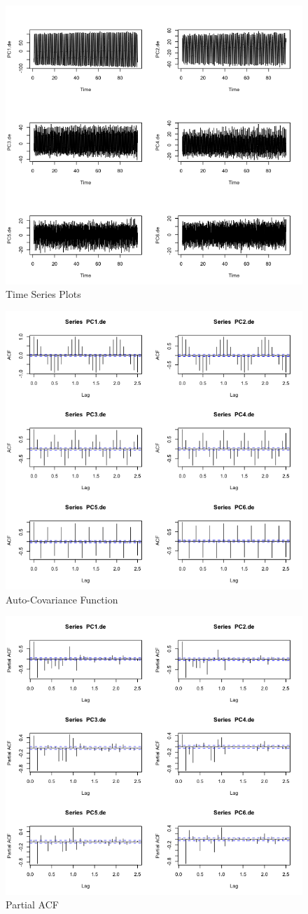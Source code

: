 \documentclass[11pt]{article}
\begin{document}
\begin{figure}
	\centering
	\includegraphics[width=0.7\linewidth]{../img/PCA_ts}
	\caption{Time Series Plots}
	\label{fig:pcats}
\end{figure}

\begin{figure}
	\centering
	\includegraphics[width=0.7\linewidth]{../img/PCAde_ACF}
	\caption{Auto-Covariance Function}
	\label{fig:pcadeacf}
\end{figure}

\begin{figure}
	\centering
	\includegraphics[width=0.7\linewidth]{../img/PCAde_pacf}
	\caption{Partial ACF}
	\label{fig:pcadpeacf}
\end{figure}
\end{document}
